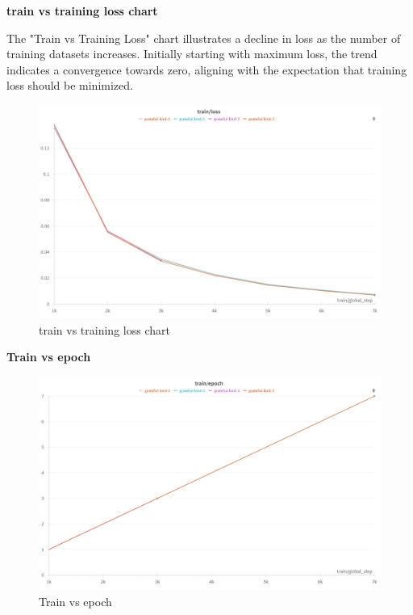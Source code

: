 \newpage
\textbf{train vs training loss chart}

The "Train vs Training Loss" chart illustrates a decline in loss as the number of training datasets increases. Initially starting with maximum loss, the trend indicates a convergence towards zero, aligning with the expectation that training loss should be minimized.

\vspace{20pt}

 \begin{figure}[H]
\centering
\includegraphics [scale=0.55]{img/result & analysis/train vs training loss chart.png}
 \caption[ train vs training loss chart]{train vs training loss chart}

\end{figure}
 

\newpage

\textbf{Train vs epoch}
\begin{figure}[H]
\centering
\includegraphics [scale=0.45]{img/result & analysis/Train vs epoch.png}
 \caption[Train vs epoch]{Train vs epoch}

\end{figure}
 
